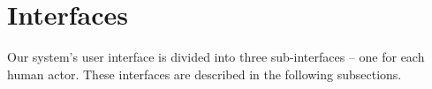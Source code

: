 \section{Interfaces}
\label{sec:interfaces}
Our system's user interface is divided into three sub-interfaces -- one for each human actor.
These interfaces are described in the following subsections.



